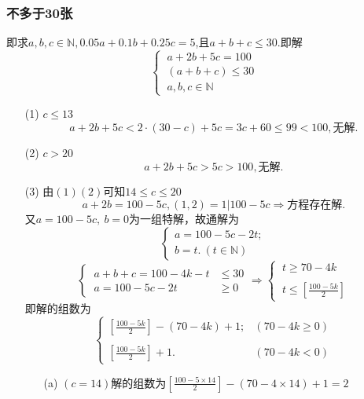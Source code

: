 \documentclass[UTF8]{ctexart}
\begin{document}
\subsubsection{不多于30张}
    即求$a,b,c \in \mathbb{N},0.05a+0.1b+0.25c=5$,且$a+b+c\leq 30$.即解
    \[
        \begin{cases}
            \ a+2b+5c = 100 \\
            \ (a+b+c) \leq 30  \\
            \ a,b,c\in \mathbb{N}
        \end{cases}
    \]
    \begin{enumerate}
        \item [(1)]$c\leq 13$
        \[a+2b+5c<2\cdot(30-c)+5c=3c+60\leq 99<100,\mbox{无解.}\]
        \item [(2)]$c >20$
        \[a+2b+5c>5c>100,\mbox{无解.}\]
        \item [(3)]由$(1)(2)$可知$14\leq c \leq 20$
        \[
            a+2b=100-5c,
            (1,2)=1|100-5c
            \Rightarrow
            \mbox{方程存在解}.
        \]
        又$a = 100-5c,\ b=0$为一组特解，故通解为
        \[
            \begin{cases}
                a = 100-5c-2t;\\
                b = t.\ (t\in\mathbb{N})
            \end{cases}
        \]
        \[
            \begin{cases}
                \ a+b+c=100-4k-t &\leq 30 \\
                \ a=100-5c-2t &\geq  0
            \end{cases}
            \Rightarrow 
            \begin{cases}
                \ t\geq 70-4k\\
                \\
                \ t\leq \displaystyle{[\frac{100-5k}{2}]}
            \end{cases}
        \]
        即解的组数为
        \[
            \begin{cases}
                \left[\displaystyle{\frac{100-5k}{2}}\right]-(70-4k)+1; &(70-4k\geq 0)\\
                \\
                \left[\displaystyle{\frac{100-5k}{2}}\right]+1.&(70-4k <0)
            \end{cases}
        \]
        \begin{enumerate}
            \item [(a)]$(c=14)$解的组数为$\left[\displaystyle{\frac{100-5\times 14}{2}}\right]-(70-4\times 14)+1=2$

\end{enumerate}
\end{enumerate}
\end{document}
